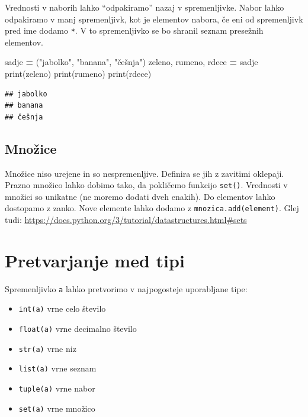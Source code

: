 \documentclass[
]{report}
\newenvironment{Shaded}{\begin{snugshade}}{\end{snugshade}}
\newcommand{\BuiltInTok}[1]{#1}
\newcommand{\NormalTok}[1]{#1}
\newcommand{\OperatorTok}[1]{\textcolor[rgb]{0.81,0.36,0.00}{\textbf{#1}}}
\newcommand{\StringTok}[1]{\textcolor[rgb]{0.31,0.60,0.02}{#1}}
\providecommand{\tightlist}{%
  \setlength{\itemsep}{0pt}\setlength{\parskip}{0pt}}
\begin{document}
Vrednosti v naborih lahko ``odpakiramo'' nazaj v spremenljivke. Nabor lahko odpakiramo v manj spremenljivk, kot je elementov nabora, če eni od spremenljivk pred ime dodamo \texttt{*}. V to spremenljivko se bo shranil seznam presežnih elementov.

\begin{Shaded}
\begin{Highlighting}[]
\NormalTok{sadje }\OperatorTok{=}\NormalTok{ (}\StringTok{"jabolko"}\NormalTok{, }\StringTok{"banana"}\NormalTok{, }\StringTok{"češnja"}\NormalTok{)}
\NormalTok{zeleno, rumeno, rdece }\OperatorTok{=}\NormalTok{ sadje}
\BuiltInTok{print}\NormalTok{(zeleno)}
\BuiltInTok{print}\NormalTok{(rumeno)}
\BuiltInTok{print}\NormalTok{(rdece)}
\end{Highlighting}
\end{Shaded}

\begin{verbatim}
## jabolko
## banana
## češnja
\end{verbatim}

\hypertarget{mnoux17eice}{%
\subsection{Množice}\label{mnoux17eice}}

Množice niso urejene in so nespremenljive. Definira se jih z zavitimi oklepaji. Prazno množico lahko dobimo tako, da pokličemo funkcijo \texttt{set()}. Vrednosti v množici so unikatne (ne moremo dodati dveh enakih). Do elementov lahko dostopamo z zanko. Nove elemente lahko dodamo z \texttt{mnozica.add(element)}. Glej tudi: \url{https://docs.python.org/3/tutorial/datastructures.html\#sets}

\hypertarget{pretvarjanje-med-tipi}{%
\section{Pretvarjanje med tipi}\label{pretvarjanje-med-tipi}}

Spremenljivko \texttt{a} lahko pretvorimo v najpogosteje uporabljane tipe:

\begin{itemize}
\tightlist
\item
  \texttt{int(a)} vrne celo število
\item
  \texttt{float(a)} vrne decimalno število
\item
  \texttt{str(a)} vrne niz
\item
  \texttt{list(a)} vrne seznam
\item
  \texttt{tuple(a)} vrne nabor
\item
  \texttt{set(a)} vrne množico
\end{itemize}
\end{document}
